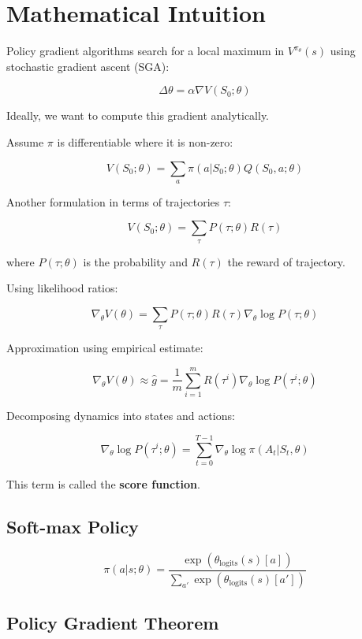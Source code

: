 \documentclass[
  letterpaper,
  DIV=11,
  numbers=noendperiod]{scrreprt}
\begin{document}
\section{Mathematical Intuition}\label{mathematical-intuition-1}

Policy gradient algorithms search for a local maximum in
\(V^{\pi_{\theta}}(s)\) using stochastic gradient ascent (SGA):

\[
\Delta \theta = \alpha \nabla V(S_{0}; \theta)
\]

Ideally, we want to compute this gradient analytically.

Assume \(\pi\) is differentiable where it is non-zero:

\[
V(S_{0}; \theta) = \sum_{a} \pi(a|S_{0}; \theta) Q(S_{0},a; \theta)
\]

Another formulation in terms of trajectories \(\tau\):

\[
V(S_{0}; \theta) = \sum_{\tau} P(\tau; \theta) R(\tau)
\]

where \(P(\tau; \theta)\) is the probability and \(R(\tau)\) the reward
of trajectory.

Using likelihood ratios:

\[
\nabla_{\theta} V(\theta) = \sum_{\tau} P(\tau; \theta) R(\tau) \nabla_{\theta} \log P(\tau; \theta)
\]

Approximation using empirical estimate:

\[
\nabla_{\theta} V(\theta) \approx \hat{g} = \frac{1}{m} \sum^{m}_{i = 1} R(\tau^{i}) \nabla_{\theta} \log P(\tau^{i}; \theta)
\]

Decomposing dynamics into states and actions:

\[
\nabla_{\theta} \log P(\tau^{i}; \theta) = \sum^{T-1}_{t=0} \nabla_{\theta} \log \pi(A_{t}|S_{t}, \theta)
\]

This term is called the \textbf{score function}.

\subsection{Soft-max Policy}\label{soft-max-policy}

\[
\pi(a|s;\theta) = \frac{\exp(\theta_{\text{logits}}(s)[a])}{\sum_{a'} \exp(\theta_{\text{logits}}(s)[a'])}
\]

\subsection{Policy Gradient Theorem}\label{policy-gradient-theorem}
\end{document}
